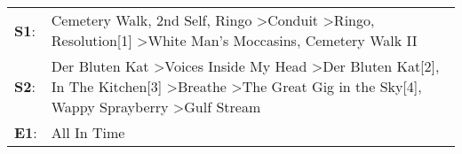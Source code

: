 \begin{supertabular}{p{0.03\textwidth}p{0.92\textwidth}}
 \textbf{S1}:  &                                                                    Cemetery Walk\textsuperscript{}, \enspace 2nd Self\textsuperscript{}, \enspace Ringo\textsuperscript{} \textgreater \enspace Conduit\textsuperscript{} \textgreater \enspace Ringo\textsuperscript{}, \enspace Resolution[1]\textsuperscript{} \textgreater \enspace White Man's Moccasins\textsuperscript{}, \enspace Cemetery Walk II\textsuperscript{}  \enspace  \\
 \textbf{S2}:  &  Der Bluten Kat\textsuperscript{} \textgreater \enspace Voices Inside My Head\textsuperscript{} \textgreater \enspace Der Bluten Kat[2]\textsuperscript{}, \enspace In The Kitchen[3]\textsuperscript{} \textgreater \enspace Breathe\textsuperscript{} \textgreater \enspace The Great Gig in the Sky[4]\textsuperscript{}, \enspace Wappy Sprayberry\textsuperscript{} \textgreater \enspace Gulf Stream\textsuperscript{}  \enspace  \\
 \textbf{E1}:  &                                                                                                                                                                                                                                                                                                                                                                                                All In Time\textsuperscript{}  \enspace  \\
\end{supertabular}
